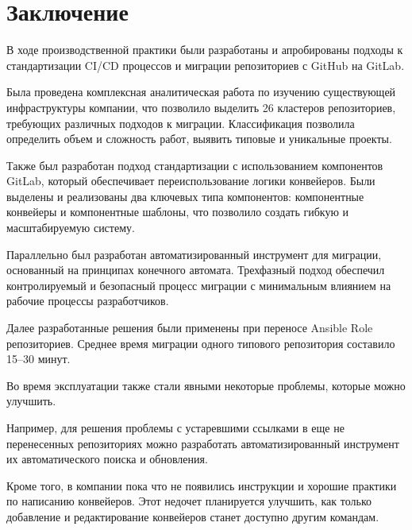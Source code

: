 \chapter*{Заключение} \label{ch:general-conclusion}

В ходе производственной практики были разработаны и апробированы подходы к стандартизации CI/CD процессов и миграции репозиториев с GitHub на GitLab.

Была проведена комплексная аналитическая работа по изучению существующей инфраструктуры компании,
что позволило выделить 26 кластеров репозиториев,
требующих различных подходов к миграции.
Классификация позволила определить объем и сложность работ, выявить типовые и уникальные проекты.

Также был разработан подход стандартизации с использованием компонентов GitLab,
который обеспечивает переиспользование логики конвейеров.
Были выделены и реализованы два ключевых типа компонентов: компонентные конвейеры и компонентные шаблоны,
что позволило создать гибкую и масштабируемую систему.

Параллельно был разработан автоматизированный инструмент для миграции,
основанный на принципах конечного автомата.
Трехфазный подход обеспечил контролируемый и безопасный процесс миграции с минимальным влиянием на рабочие процессы разработчиков.

Далее разработанные решения были применены при переносе Ansible Role репозиториев.
Среднее время миграции одного типового репозитория составило 15--30 минут.

Во время эксплуатации также стали явными некоторые проблемы, которые можно улучшить.

Например, для решения проблемы с устаревшими ссылками в еще не перенесенных репозиториях
можно разработать автоматизированный инструмент их автоматического поиска и обновления.

Кроме того, в компании пока что не появились инструкции и хорошие практики по написанию конвейеров.
Этот недочет планируется улучшить, как только добавление и редактирование конвейеров станет доступно другим командам.
